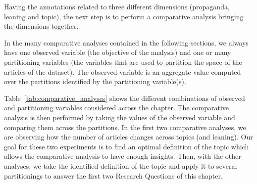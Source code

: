 Having the annotations related to three different dimensions (propaganda, leaning and topic), the next step is to perform a comparative analysis bringing the dimensions together.

In the many comparative analyses contained in the following sections, we always have one observed variable (the objective of the analysis) and one or many partitioning variables (the variables that are used to partition the space of the articles of the dataset). The observed variable is an aggregate value computed over the partitions identified by the partitioning variable(s).

\begin{table}[!htbp]
    \centering
    \caption{The comparative analyses of this chapter.}
    \label{tab:comparative_analyses}
\end{table}

Table~\ref{tab:comparative_analyses} shows the different combinations of observed and partitioning variables considered across the chapter.
The comparative analysis is then performed by taking the values of the observed variable and comparing them across the partitions.
In the first two comparative analyses, we are observing how the number of articles changes across topics (and leaning). Our goal for these two experiments is to find an optimal definition of the topic which allows the comparative analysis to have enough insights.
Then, with the other analyses, we take the identified definition of the topic and apply it to several partitionings to answer the first two Research Questions of this chapter.



